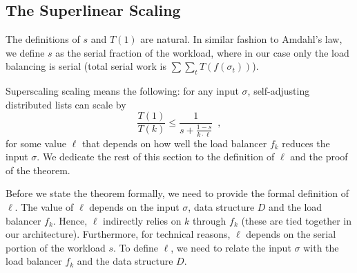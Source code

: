 \subsection{The Superlinear Scaling}

The definitions of $s$ and $T(1)$ are natural.
In similar fashion to Amdahl's law, we define $s$ as the serial fraction of the workload, where in our case only the load balancing is serial (total serial work is $\sum \sum_t T(f(\sigma_t))$).


Superscaling scaling means the following: for any input $\sigma$, self-adjusting distributed lists can scale by
\begin{equation*}\label{eq:mtf-perf}
  \frac{T(1)}{T(k)} \le \frac1{s + \frac{1-s}{k \cdot \ell}} \enspace ,
\end{equation*}
for some value $\ell$ that depends on how well the load balancer $f_k$ reduces the input $\sigma$.
We dedicate the rest of this section to the definition of $\ell$ and the proof of the theorem.









Before we state the theorem formally, we need to provide the formal definition of $\ell$.
The value of $\ell$ depends on the input $\sigma$, data structure $D$ and the load balancer $f_k$. Hence, $\ell$ indirectly relies on $k$ through $f_k$ (these are tied together in our architecture). Furthermore, for technical reasons, $\ell$ depends on the serial portion of the workload $s$.
To define $\ell$, we need to relate the input $\sigma$ with the load balancer $f_k$ and the data structure $D$.




